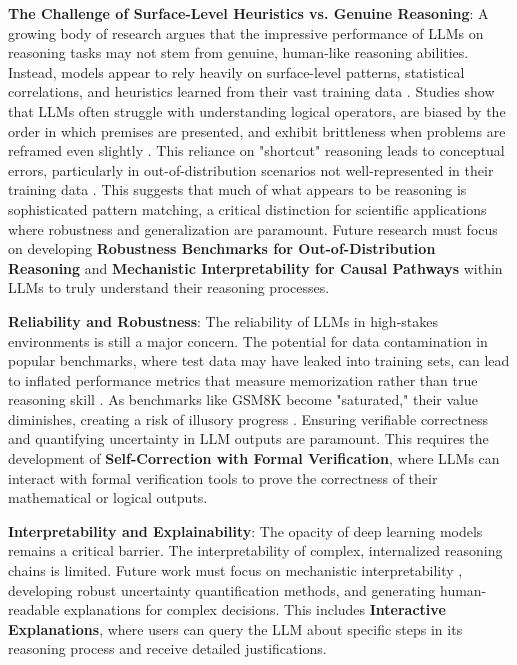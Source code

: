 \documentclass{article}
\begin{document}
\textbf{The Challenge of Surface-Level Heuristics vs. Genuine Reasoning}: A growing body of research argues that the impressive performance of LLMs on reasoning tasks may not stem from genuine, human-like reasoning abilities. Instead, models appear to rely heavily on surface-level patterns, statistical correlations, and heuristics learned from their vast training data \cite{mondorf2024beyond}. Studies show that LLMs often struggle with understanding logical operators, are biased by the order in which premises are presented, and exhibit brittleness when problems are reframed even slightly \cite{mondorf2024beyond}. This reliance on "shortcut" reasoning leads to conceptual errors, particularly in out-of-distribution scenarios not well-represented in their training data \cite{mondorf2024beyond}. This suggests that much of what appears to be reasoning is sophisticated pattern matching, a critical distinction for scientific applications where robustness and generalization are paramount. Future research must focus on developing \textbf{Robustness Benchmarks for Out-of-Distribution Reasoning} and \textbf{Mechanistic Interpretability for Causal Pathways} within LLMs to truly understand their reasoning processes.

\textbf{Reliability and Robustness}: The reliability of LLMs in high-stakes environments is still a major concern. The potential for data contamination in popular benchmarks, where test data may have leaked into training sets, can lead to inflated performance metrics that measure memorization rather than true reasoning skill \cite{hai2025index}. As benchmarks like GSM8K become "saturated," their value diminishes, creating a risk of illusory progress \cite{aiindex2025saturation}. Ensuring verifiable correctness and quantifying uncertainty in LLM outputs are paramount. This requires the development of \textbf{Self-Correction with Formal Verification}, where LLMs can interact with formal verification tools to prove the correctness of their mathematical or logical outputs.

\textbf{Interpretability and Explainability}: The opacity of deep learning models remains a critical barrier. The interpretability of complex, internalized reasoning chains is limited. Future work must focus on mechanistic interpretability \cite{olah2020zoom}, developing robust uncertainty quantification methods, and generating human-readable explanations for complex decisions. This includes \textbf{Interactive Explanations}, where users can query the LLM about specific steps in its reasoning process and receive detailed justifications.
\end{document}
